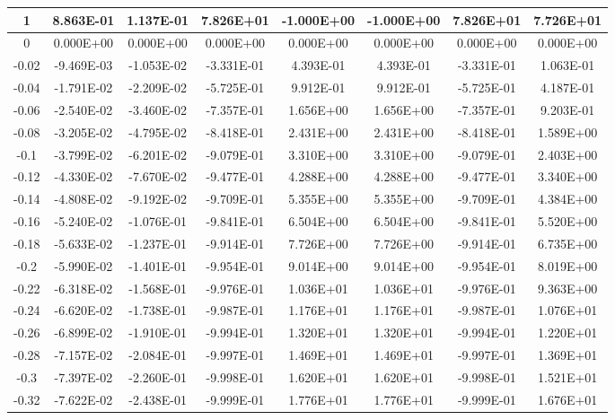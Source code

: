 \documentclass{article}
\begin{document}
\begin{center}
\begin{longtable}{|c|c|c|c|c|c|c|c|}
        1 & 8.863E-01 & 1.137E-01 & 7.826E+01 & -1.000E+00 & -1.000E+00 & 7.826E+01 & 7.726E+01 \\ \hline
        0 & 0.000E+00 & 0.000E+00 & 0.000E+00 & 0.000E+00 & 0.000E+00 & 0.000E+00 & 0.000E+00 \\ \hline
        -0.02 & -9.469E-03 & -1.053E-02 & -3.331E-01 & 4.393E-01 & 4.393E-01 & -3.331E-01 & 1.063E-01 \\ \hline
        -0.04 & -1.791E-02 & -2.209E-02 & -5.725E-01 & 9.912E-01 & 9.912E-01 & -5.725E-01 & 4.187E-01 \\ \hline
        -0.06 & -2.540E-02 & -3.460E-02 & -7.357E-01 & 1.656E+00 & 1.656E+00 & -7.357E-01 & 9.203E-01 \\ \hline
        -0.08 & -3.205E-02 & -4.795E-02 & -8.418E-01 & 2.431E+00 & 2.431E+00 & -8.418E-01 & 1.589E+00 \\ \hline
        -0.1 & -3.799E-02 & -6.201E-02 & -9.079E-01 & 3.310E+00 & 3.310E+00 & -9.079E-01 & 2.403E+00 \\ \hline
        -0.12 & -4.330E-02 & -7.670E-02 & -9.477E-01 & 4.288E+00 & 4.288E+00 & -9.477E-01 & 3.340E+00 \\ \hline
        -0.14 & -4.808E-02 & -9.192E-02 & -9.709E-01 & 5.355E+00 & 5.355E+00 & -9.709E-01 & 4.384E+00 \\ \hline
        -0.16 & -5.240E-02 & -1.076E-01 & -9.841E-01 & 6.504E+00 & 6.504E+00 & -9.841E-01 & 5.520E+00 \\ \hline
        -0.18 & -5.633E-02 & -1.237E-01 & -9.914E-01 & 7.726E+00 & 7.726E+00 & -9.914E-01 & 6.735E+00 \\ \hline
        -0.2 & -5.990E-02 & -1.401E-01 & -9.954E-01 & 9.014E+00 & 9.014E+00 & -9.954E-01 & 8.019E+00 \\ \hline
        -0.22 & -6.318E-02 & -1.568E-01 & -9.976E-01 & 1.036E+01 & 1.036E+01 & -9.976E-01 & 9.363E+00 \\ \hline
        -0.24 & -6.620E-02 & -1.738E-01 & -9.987E-01 & 1.176E+01 & 1.176E+01 & -9.987E-01 & 1.076E+01 \\ \hline
        -0.26 & -6.899E-02 & -1.910E-01 & -9.994E-01 & 1.320E+01 & 1.320E+01 & -9.994E-01 & 1.220E+01 \\ \hline
        -0.28 & -7.157E-02 & -2.084E-01 & -9.997E-01 & 1.469E+01 & 1.469E+01 & -9.997E-01 & 1.369E+01 \\ \hline
        -0.3 & -7.397E-02 & -2.260E-01 & -9.998E-01 & 1.620E+01 & 1.620E+01 & -9.998E-01 & 1.521E+01 \\ \hline
        -0.32 & -7.622E-02 & -2.438E-01 & -9.999E-01 & 1.776E+01 & 1.776E+01 & -9.999E-01 & 1.676E+01 \\ \hline

\end{longtable}
\end{center}
\end{document}
